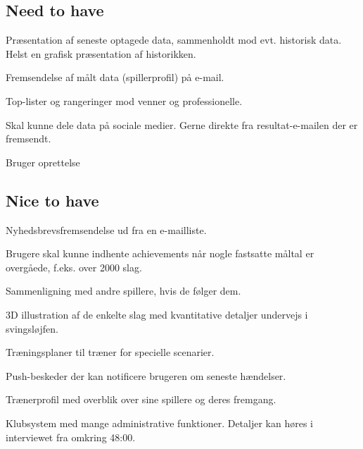 \subsection*{Need to have}
Præsentation af seneste optagede data, sammenholdt mod evt. historisk data.
Helst en grafisk præsentation af historikken.

Fremsendelse af målt data (spillerprofil) på e-mail.

Top-lister og rangeringer mod venner og professionelle.

Skal kunne dele data på sociale medier. 
Gerne direkte fra resultat-e-mailen der er fremsendt.

Bruger oprettelse

\subsection*{Nice to have}
Nyhedsbrevsfremsendelse ud fra en e-mailliste.

Brugere skal kunne indhente achievements når nogle fastsatte måltal er overgåede, f.eks. over 2000 slag.

Sammenligning med andre spillere, hvis de følger dem.

3D illustration af de enkelte slag med kvantitative detaljer undervejs i svingsløjfen.

Træningsplaner til træner for specielle scenarier.

Push-beskeder der kan notificere brugeren om seneste hændelser.

Trænerprofil med overblik over sine spillere og deres fremgang. 

Klubsystem med mange administrative funktioner.
Detaljer kan høres i interviewet fra omkring 48:00. 
